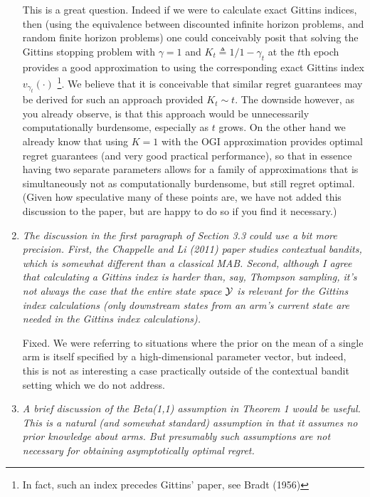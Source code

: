 \documentclass[11pt]{article}
\newcommand{\1}{\ensuremath{\mathbf{1}}} %
\theoremstyle{thm-sf}
\begin{document}
\begin{enumerate}
	
This is a great question. Indeed if we were to calculate exact Gittins indices, then (using the equivalence between discounted infinite horizon problems, and random finite horizon problems) one could conceivably posit that solving the Gittins stopping problem with $\gamma = 1$ and $K_t \triangleq 1/1 - \gamma_t$ at the $t$th epoch provides a good approximation to using the corresponding exact Gittins index $v_{\gamma_t}(\cdot)$ \footnote{In fact, such an index precedes Gittins' paper, see Bradt (1956)}. We believe that it is conceivable that similar regret guarantees may be derived for such an approach provided $K_t \sim t$. The downside however, as you already observe, is that this approach would be unnecessarily computationally burdensome, especially as $t$ grows. On the other hand we already know that using $K=1$ with the OGI approximation provides optimal regret guarantees (and very good practical performance), so that in essence having two separate parameters allows for a family of approximations that is simultaneously not as computationally burdensome, but still regret optimal. (Given how speculative many of these points are, we have not added this discussion to the paper, but are happy to do so if you find it necessary.) 




		
	\item {\it The discussion in the first paragraph of Section 3.3 could use a bit more precision. First, the Chappelle and Li (2011) paper studies contextual bandits, which is somewhat different than a classical MAB. Second, although I agree that calculating a Gittins index is harder than, say, Thompson sampling, it’s not always the case that the entire state space $\cal{Y}$ is relevant for the Gittins index calculations (only downstream states from an arm’s current state are needed in the Gittins index calculations).}
	
	Fixed. We were referring to situations where the prior on the mean of a single arm is itself specified by a high-dimensional parameter vector, but indeed, this is not as interesting a case practically outside of the contextual bandit setting which we do not address. 
	
	\item {\it A brief discussion of the Beta(1,1) assumption in Theorem 1 would be useful. This is a natural (and somewhat standard) assumption in that it assumes no prior knowledge about arms. But presumably such assumptions are not necessary for obtaining asymptotically optimal regret.
	}


\end{enumerate}
\end{document}
